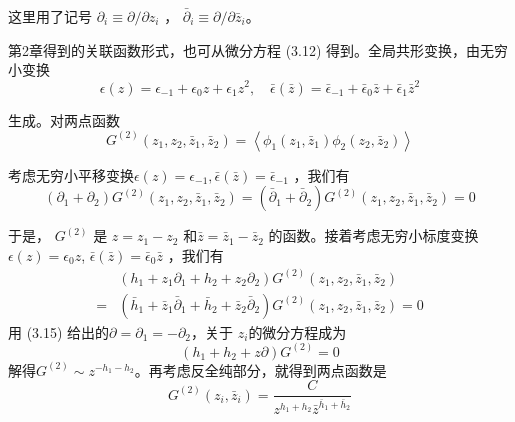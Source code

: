 这里用了记号 $\partial_i\equiv \partial/\partial z_i$ ， $\bar{\partial}_i\equiv \partial/\partial \bar{z}_i $。

第2章得到的关联函数形式，也可从微分方程 (3.12) 得到。全局共形变换，由无穷小变换
\begin{equation}
\epsilon(z)=\epsilon_{-1}+\epsilon_{0} z+\epsilon_{1} z^{2}, \quad \bar{\epsilon}(\bar{z})=\bar{\epsilon}_{-1}+\bar{\epsilon}_{0} \bar{z}+\bar{\epsilon}_{1} \bar{z}^{2}
\end{equation}

生成。对两点函数
\begin{equation}
G^{(2)}\left(z_{1}, z_{2}, \bar{z}_{1}, \bar{z}_{2}\right)=\left\langle\phi_{1}\left(z_{1}, \bar{z}_{1}\right) \phi_{2}\left(z_{2}, \bar{z}_{2}\right)\right\rangle
\end{equation}

考虑无穷小平移变换$ \epsilon(z)=\epsilon_{-1}, \bar{\epsilon}(\bar{z})=\bar{\epsilon}_{-1}$ ，我们有
\begin{equation}
\left(\partial_{1}+\partial_{2}\right) G^{(2)}\left(z_{1}, z_{2}, \bar{z}_{1}, \bar{z}_{2}\right)=\left(\bar{\partial}_{1}+\bar{\partial}_{2}\right) G^{(2)}\left(z_{1}, z_{2}, \bar{z}_{1}, \bar{z}_{2}\right)=0
\end{equation}

于是， $G^{(2)}$ 是 $z=z_1-z_2$ 和$ \bar{z}=\bar{z}_1-\bar{z}_2$ 的函数。接着考虑无穷小标度变换$ \epsilon(z)=\epsilon_{0} z$, $\bar{\epsilon}(\bar{z})=\bar{\epsilon}_{0} \bar{z}$ ，我们有
\begin{equation}
\begin{aligned} &\left(h_{1}+z_{1} \partial_{1}+h_{2}+z_{2} \partial_{2}\right) G^{(2)}\left(z_{1}, z_{2}, \bar{z}_{1}, \bar{z}_{2}\right) \\ =&\left(\bar{h}_{1}+\bar{z}_{1} \bar{\partial}_{1}+\bar{h}_{2}+\bar{z}_{2} \bar{\partial}_{2}\right) G^{(2)}\left(z_{1}, z_{2}, \bar{z}_{1}, \bar{z}_{2}\right)=0 \end{aligned}
\end{equation}
用 (3.15) 给出的$ \partial=\partial_{1}=-\partial_{2} $，关于 $z_i $的微分方程成为
\[
\left(h_{1}+h_{2}+z \partial\right) G^{(2)}=0
\]
解得$ G^{(2)} \sim z^{-h_{1}-h_{2}}$。再考虑反全纯部分，就得到两点函数是
\begin{equation}
G^{(2)}\left(z_{i}, \bar{z}_{i}\right)=\frac{C}{z^{h_{1}+h_{2}} \bar{z}^{\bar{h}_{1}+\bar{h}_{2}}}
\end{equation}

